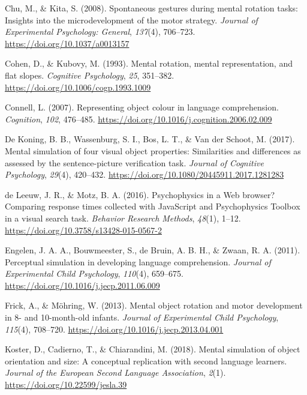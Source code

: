 \documentclass[
  man]{apa7}
\newlength{\cslhangindent}
\newlength{\cslentryspacingunit} %
\newenvironment{CSLReferences}[2] %
 {%
  \setlength{\parindent}{0pt}
  \ifodd #1
  \let\oldpar\par
  \def\par{\hangindent=\cslhangindent\oldpar}
  \fi
  \setlength{\parskip}{#2\cslentryspacingunit}
 }%
 {}
\begin{document}
\begin{CSLReferences}{1}{0}
\leavevmode{}%
Chu, M., \& Kita, S. (2008). Spontaneous gestures during mental rotation tasks: {Insights} into the microdevelopment of the motor strategy. \emph{Journal of Experimental Psychology: General}, \emph{137}(4), 706--723. \url{https://doi.org/10.1037/a0013157}

\leavevmode{}%
Cohen, D., \& Kubovy, M. (1993). Mental rotation, mental representation, and flat slopes. \emph{Cognitive Psychology}, \emph{25}, 351--382. \url{https://doi.org/10.1006/cogp.1993.1009}

\leavevmode{}%
Connell, L. (2007). Representing object colour in language comprehension. \emph{Cognition}, \emph{102}, 476--485. \url{https://doi.org/10.1016/j.cognition.2006.02.009}

\leavevmode{}%
De Koning, B. B., Wassenburg, S. I., Bos, L. T., \& Van der Schoot, M. (2017). Mental simulation of four visual object properties: Similarities and differences as assessed by the sentence-picture verification task. \emph{Journal of Cognitive Psychology}, \emph{29}(4), 420--432. \url{https://doi.org/10.1080/20445911.2017.1281283}

\leavevmode{}%
de Leeuw, J. R., \& Motz, B. A. (2016). Psychophysics in a {Web} browser? {Comparing} response times collected with {JavaScript} and {Psychophysics Toolbox} in a visual search task. \emph{Behavior Research Methods}, \emph{48}(1), 1--12. \url{https://doi.org/10.3758/s13428-015-0567-2}

\leavevmode{}%
Engelen, J. A. A., Bouwmeester, S., de Bruin, A. B. H., \& Zwaan, R. A. (2011). Perceptual simulation in developing language comprehension. \emph{Journal of Experimental Child Psychology}, \emph{110}(4), 659--675. \url{https://doi.org/10.1016/j.jecp.2011.06.009}

\leavevmode{}%
Frick, A., \& Möhring, W. (2013). Mental object rotation and motor development in 8- and 10-month-old infants. \emph{Journal of Experimental Child Psychology}, \emph{115}(4), 708--720. \url{https://doi.org/10.1016/j.jecp.2013.04.001}

\leavevmode{}%
Koster, D., Cadierno, T., \& Chiarandini, M. (2018). Mental simulation of object orientation and size: {A} conceptual replication with second language learners. \emph{Journal of the European Second Language Association}, \emph{2}(1). \url{https://doi.org/10.22599/jesla.39}


\end{CSLReferences}
\end{document}
